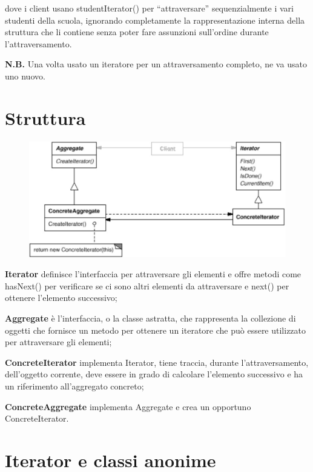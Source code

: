 dove i client usano studentIterator() per “attraversare” sequenzialmente i vari studenti della scuola, ignorando completamente la rappresentazione interna della 
struttura che li contiene senza poter fare assunzioni sull’ordine durante l’attraversamento.

\medskip
\textbf{N.B.} Una volta usato un iteratore per un attraversamento completo, ne va usato uno nuovo.

\section{Struttura}

\begin{figure}[H]
    \centering
    \includegraphics[width=0.5\linewidth]{../../immagini/iterator/struttura_visitor}
\end{figure}

\textbf{Iterator} definisce l'interfaccia per attraversare gli elementi e offre metodi come hasNext() per verificare se ci sono altri elementi da attraversare e next()
per ottenere l'elemento successivo;

\textbf{Aggregate} è l'interfaccia, o la classe astratta, che rappresenta la collezione di oggetti che fornisce un metodo per ottenere un iteratore che può essere 
utilizzato per attraversare gli elementi;

\textbf{ConcreteIterator} implementa Iterator, tiene traccia, durante l’attraversamento, dell’oggetto corrente, deve essere in grado di calcolare l’elemento 
successivo e ha un riferimento all’aggregato concreto;

\textbf{ConcreteAggregate} implementa Aggregate e crea un opportuno ConcreteIterator.

\section{Iterator e classi anonime}

